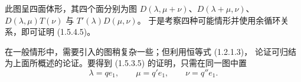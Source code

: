此图呈四面体形，其四个面分别为图
$D(\lambda,\mu+\nu)$、$D(\lambda+\mu,\nu)$、
$D(\lambda,\mu)T(\nu)$ 与 $T'(\lambda)D(\mu,\nu)$。
于是考察四种可能情形并使用余循环关系，即可证明 (1.5.4.5)。

在一般情形中，需要引入的图稍复杂一些；但利用恒等式 (1.2.1.3)，
论证可归结为上面所概述的论证。要得到 (1.5.3.5) 的证明，只需在同一图中置
\[
  \lambda=qe_1,\qquad \mu=q'e_1,\qquad \nu=q''e_1.
\]
